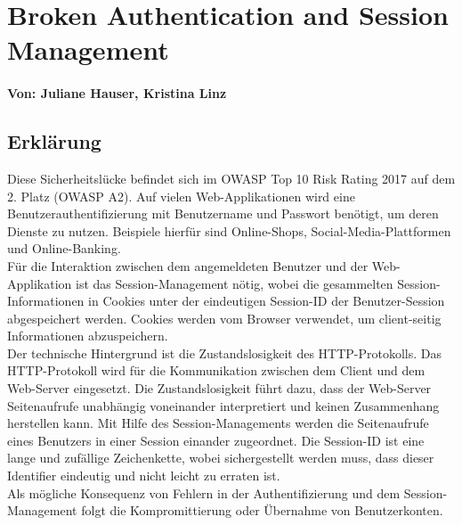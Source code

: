 \chapter{Broken Authentication and Session Management}
\label{BrokenAuthenticationAndSessionManagement}
\subsubsection*{Von: Juliane Hauser, Kristina Linz}
\section{Erklärung}
Diese Sicherheitslücke befindet sich im OWASP Top 10 Risk Rating 2017 auf dem 2. Platz (OWASP A2). 
Auf vielen Web-Applikationen wird eine Benutzerauthentifizierung mit Benutzername und Passwort benötigt, um deren Dienste zu nutzen. Beispiele hierfür sind Online-Shops, Social-Media-Plattformen und Online-Banking. 
\\
Für die Interaktion zwischen dem angemeldeten Benutzer und der Web-Applikation ist das Session-Management nötig, wobei die gesammelten Session-Informationen in Cookies unter der eindeutigen Session-ID der Benutzer-Session abgespeichert werden. Cookies werden vom Browser verwendet, um client-seitig Informationen abzuspeichern.
\\
Der technische Hintergrund ist die Zustandslosigkeit des HTTP-Protokolls. Das HTTP-Protokoll wird für die Kommunikation zwischen dem Client und dem Web-Server eingesetzt. Die Zustandslosigkeit führt dazu, dass der Web-Server Seitenaufrufe unabhängig voneinander interpretiert und keinen Zusammenhang herstellen kann. Mit Hilfe des Session-Managements werden die Seitenaufrufe eines Benutzers in einer Session einander zugeordnet. Die Session-ID ist eine lange und zufällige Zeichenkette, wobei sichergestellt werden muss, dass dieser Identifier eindeutig und nicht leicht zu erraten ist.
\\
Als mögliche Konsequenz von Fehlern in der Authentifizierung und dem Session-Management folgt die Kompromittierung oder Übernahme von Benutzerkonten.

